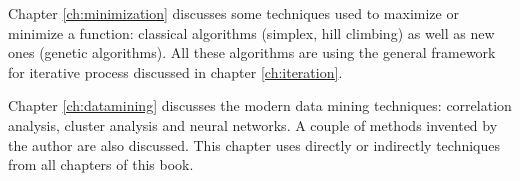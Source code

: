 Chapter \ref{ch:minimization} discusses some techniques used to
maximize or minimize a function: classical algorithms (simplex,
hill climbing) as well as new ones (genetic algorithms). All these
algorithms are using the general framework for iterative process
discussed in chapter \ref{ch:iteration}.

Chapter \ref{ch:datamining} discusses the modern data mining
techniques: correlation analysis, cluster analysis and neural
networks. A couple of methods invented by the author are also
discussed. This chapter uses directly or indirectly techniques
from all chapters of this book.

